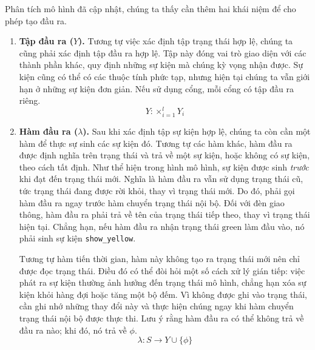 Phân tích mô hình đã cập nhật, chúng ta thấy cần thêm hai khái niệm để cho phép tạo đầu ra.
\begin{enumerate}
\item \textbf{Tập đầu ra ($Y$).} Tương tự việc xác định tập trạng thái hợp lệ, chúng ta cũng phải xác định tập đầu ra hợp lệ. Tập này đóng vai trò giao diện với các thành phần khác, quy định những sự kiện mà chúng kỳ vọng nhận được. Sự kiện cũng có thể có các thuộc tính phức tạp, nhưng hiện tại chúng ta vẫn giới hạn ở những sự kiện đơn giản. Nếu sử dụng cổng, mỗi cổng có tập đầu ra riêng.
\[
Y:\times_{i=1}^{l}Y_i
\]
\item \textbf{Hàm đầu ra ($\lambda$).} Sau khi xác định tập sự kiện hợp lệ, chúng ta còn cần một hàm để thực sự sinh các sự kiện đó. Tương tự các hàm khác, hàm đầu ra được định nghĩa trên trạng thái và trả về một sự kiện, hoặc không có sự kiện, theo cách tất định. Như thể hiện trong hình mô hình, sự kiện được sinh \emph{trước} khi đạt đến trạng thái mới. Nghĩa là hàm đầu ra vẫn sử dụng trạng thái cũ, tức trạng thái đang được rời khỏi, thay vì trạng thái mới. Do đó, phải gọi hàm đầu ra ngay trước hàm chuyển trạng thái nội bộ. Đối với đèn giao thông, hàm đầu ra phải trả về tên của trạng thái tiếp theo, thay vì trạng thái hiện tại. Chẳng hạn, nếu hàm đầu ra nhận trạng thái $\mathrm{green}$ làm đầu vào, nó phải sinh sự kiện \texttt{show\_yellow}.

Tương tự hàm tiến thời gian, hàm này không tạo ra trạng thái mới nên chỉ được đọc trạng thái. Điều đó có thể đòi hỏi một số cách xử lý gián tiếp: việc phát ra sự kiện thường ảnh hưởng đến trạng thái mô hình, chẳng hạn xóa sự kiện khỏi hàng đợi hoặc tăng một bộ đếm. Vì không được ghi vào trạng thái, cần ghi nhớ những thay đổi này và thực hiện chúng ngay khi hàm chuyển trạng thái nội bộ được thực thi. Lưu ý rằng hàm đầu ra có thể không trả về đầu ra nào; khi đó, nó trả về $\phi$.
\[
\lambda:S\rightarrow Y\cup\{\phi\}
\]
\end{enumerate}

